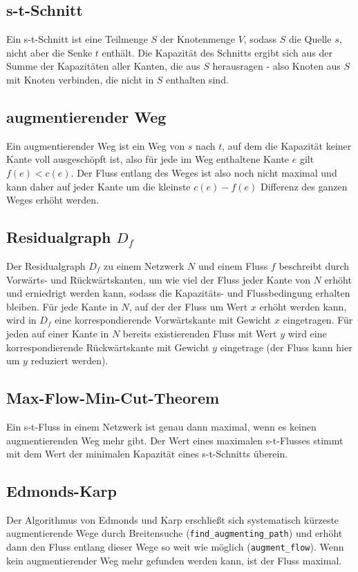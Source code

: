 \documentclass[10pt,a4paper,landscape]{article}
\begin{document}
\begin{multicols*}{2}
    \subsection*{ s-t-Schnitt }
    Ein s-t-Schnitt ist eine Teilmenge $S$ der Knotenmenge $V$, sodass $S$ die Quelle $s$, nicht aber die Senke $t$ enthält.
    Die Kapazität des Schnitts ergibt sich aus der Summe der Kapazitäten aller Kanten, die aus $S$ herausragen - also Knoten aus $S$ 
    mit Knoten verbinden, die nicht in $S$ enthalten sind.

    \subsection*{ augmentierender Weg }
    Ein augmentierender Weg ist ein Weg von $s$ nach $t$, auf dem die Kapazität keiner Kante voll ausgeschöpft ist, also für jede im Weg enthaltene 
    Kante $e$ gilt $f(e) < c(e)$. Der Fluss entlang des Weges ist also noch nicht maximal und kann daher auf jeder Kante um die kleinste $c(e) - f(e)$ 
    Differenz des ganzen Weges erhöht werden.

    \subsection*{ Residualgraph $D_f$ }
    Der Residualgraph $D_f$ zu einem Netzwerk $N$ und einem Fluss $f$ beschreibt durch Vorwärts- und Rückwärtskanten, um wie viel der Fluss jeder Kante von $N$ 
    erhöht und erniedrigt werden kann, sodass die Kapazitäts- und Flussbedingung erhalten bleiben. Für jede Kante in $N$, auf der der Fluss um Wert $x$ erhöht 
    werden kann, wird in $D_f$ eine korrespondierende Vorwärtskante mit Gewicht $x$ eingetragen. Für jeden auf einer Kante in $N$ bereits existierenden Fluss mit Wert $y$ 
    wird eine korrespondierende Rückwärtskante mit Gewicht $y$ eingetrage (der Fluss kann hier um $y$ reduziert werden).
    
    \subsection{ Max-Flow-Min-Cut-Theorem }
    Ein s-t-Fluss in einem Netzwerk ist genau dann maximal, wenn es keinen augmentierenden Weg mehr gibt. Der Wert eines maximalen s-t-Flusses stimmt mit dem Wert 
    der minimalen Kapazität eines s-t-Schnitts überein.

    \subsection{ Edmonds-Karp }
    Der Algorithmus von Edmonds und Karp erschließt sich systematisch kürzeste augmentierende Wege durch Breitensuche (\verb|find_augmenting_path|) und erhöht dann den Fluss entlang dieser Wege so 
    weit wie möglich (\verb|augment_flow|). Wenn kein augmentierender Weg mehr gefunden werden kann, ist der Fluss maximal.


\end{multicols*}
\end{document}
